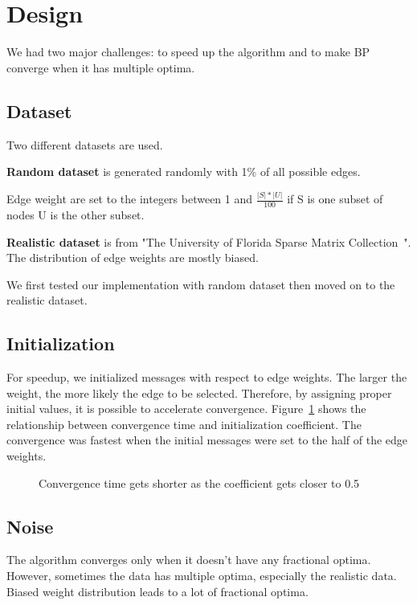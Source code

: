 
\section{Design}

We had two major challenges: to speed up the algorithm and to make BP converge when it has multiple optima.

\subsection{Dataset}
Two different datasets are used. 

\textbf{Random dataset} is generated randomly with 1\% of all possible edges.

Edge weight are set to the integers between 1 and $\frac{|S| * |U|}{100}$ if S is one subset of nodes U is the other subset.

\textbf{Realistic dataset} is from "The University of Florida Sparse Matrix Collection~\cite{sparseMatrix}".
The distribution of edge weights are mostly biased.

We first tested our implementation with random dataset then moved on to the realistic dataset.

\subsection{Initialization}
For speedup, we initialized messages with respect to edge weights.
The larger the weight, the more likely the edge to be selected. 
Therefore, by assigning proper initial values, it is possible to accelerate convergence.
Figure~\ref{fig:init} shows the relationship between convergence time and initialization coefficient.
The convergence was fastest when the initial messages were set to the half of the edge weights.
\begin{figure}
\centering
\caption{Convergence time gets shorter as the coefficient gets closer to 0.5}
\label{fig:init}
\end{figure}

\subsection{Noise}
The algorithm converges only when it doesn't have any fractional optima. 
However, sometimes the data has multiple optima, especially the realistic data. Biased weight distribution leads to a lot of fractional optima. 


